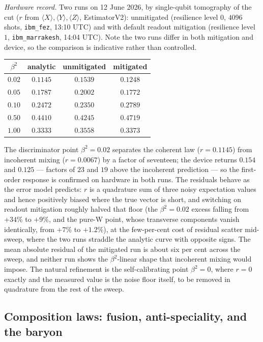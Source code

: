 \emph{Hardware record.} Two runs on 12 June 2026, by single-qubit tomography of the cut
($r$ from $\langle X\rangle, \langle Y\rangle, \langle Z\rangle$, EstimatorV2): unmitigated
(resilience level $0$, $4096$ shots, \texttt{ibm\_fez}, 13:10 UTC) and with default readout
mitigation (resilience level $1$, \texttt{ibm\_marrakesh}, 14:04 UTC). Note the two runs differ in
both mitigation and device, so the comparison is indicative rather than controlled.
\begin{center}
\begin{tabular}{cccc}
\hline
$\beta^2$ & analytic & unmitigated & mitigated \\
\hline
$0.02$ & $0.1145$ & $0.1539$ & $0.1248$ \\
$0.05$ & $0.1787$ & $0.2002$ & $0.1772$ \\
$0.10$ & $0.2472$ & $0.2350$ & $0.2789$ \\
$0.50$ & $0.4410$ & $0.4245$ & $0.4719$ \\
$1.00$ & $0.3333$ & $0.3558$ & $0.3373$ \\
\hline
\end{tabular}
\end{center}
The discriminator point $\beta^2 = 0.02$ separates the coherent law ($r = 0.1145$) from incoherent
mixing ($r = 0.0067$) by a factor of seventeen; the device returns $0.154$ and $0.125$ --- factors
of $23$ and $19$ above the incoherent prediction --- so the first-order response is confirmed on
hardware in both runs. The residuals behave as the error model predicts: $r$ is a quadrature sum
of three noisy expectation values and hence positively biased where the true vector is short, and
switching on readout mitigation roughly halved that floor (the $\beta^2 = 0.02$ excess falling
from $+34\%$ to $+9\%$, and the pure-W point, whose transverse components vanish identically, from
$+7\%$ to $+1.2\%$), at the few-per-cent cost of residual scatter mid-sweep, where the two runs
straddle the analytic curve with opposite signs. The mean absolute residual of the mitigated run
is about six per cent across the sweep, and neither run shows the $\beta^2$-linear shape that
incoherent mixing would impose. The natural refinement is the self-calibrating point
$\beta^2 = 0$, where $r = 0$ exactly and the measured value is the noise floor itself, to be
removed in quadrature from the rest of the sweep.

\subsection{Composition laws: fusion, anti-speciality, and the baryon}
\label{app:qiskit-composition}


